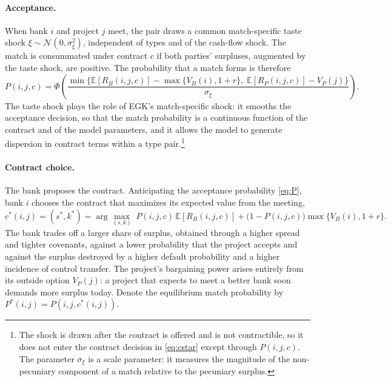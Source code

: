 \documentclass[12pt]{article}
\newcommand{\E}{\mathbb{E}}
\newcommand{\RB}{R_B}
\newcommand{\RP}{R_P}
\begin{document}
\paragraph{Acceptance.}
When bank $i$ and project $j$ meet, the pair draws a common match-specific
taste shock $\xi \sim \mathcal{N}(0, \sigma_\xi^2)$, independent of types and
of the cash-flow shock. The match is consummated under contract $c$ if both
parties' surpluses, augmented by the taste shock, are positive. The
probability that a match forms is therefore
\begin{equation}
  P(i,j,c) = \Phi\!\left(\frac{\min\Big\{\E[\RB(i,j,c)] - \max\{V_B(i), 1+r\},\;
     \E[\RP(i,j,c)] - V_P(j)\Big\}}{\sigma_\xi}\right).
  \label{eq:P}
\end{equation}
The taste shock plays the role of EGK's match-specific shock: it smooths the
acceptance decision, so that the match probability is a continuous function
of the contract and of the model parameters, and it allows the model to
generate dispersion in contract terms within a type pair.\footnote{The
shock is drawn after the contract is offered and is not contractible, so it
does not enter the contract decision in \eqref{eq:cstar} except through
$P(i,j,c)$. The parameter $\sigma_\xi$ is a scale parameter: it measures the
magnitude of the non-pecuniary component of a match relative to the
pecuniary surplus.}

\paragraph{Contract choice.}
The bank proposes the contract. Anticipating the acceptance probability
\eqref{eq:P}, bank $i$ chooses the contract that maximizes its expected value
from the meeting,
\begin{equation}
  c^*(i,j) = (s^*, k^*) = \arg\max_{(s,k)}\;
  P(i,j,c)\, \E[\RB(i,j,c)] + \big(1 - P(i,j,c)\big) \max\{V_B(i), 1 + r\}.
  \label{eq:cstar}
\end{equation}
The bank trades off a larger share of surplus, obtained through a higher
spread and tighter covenants, against a lower probability that the project
accepts and against the surplus destroyed by a higher default probability and
a higher incidence of control transfer. The project's bargaining power arises
entirely from its outside option $V_P(j)$: a project that expects to meet a
better bank soon demands more surplus today. Denote the equilibrium match
probability by $P^*(i,j) = P(i,j,c^*(i,j))$.
\end{document}
